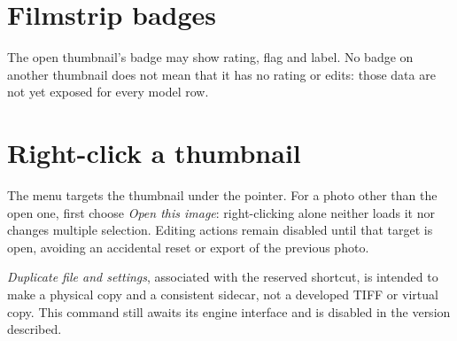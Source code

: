 
\section{Filmstrip badges}
The open thumbnail's badge may show rating, flag and label. No badge on another
thumbnail does not mean that it has no rating or edits: those data are not yet
exposed for every model row.

\section{Right-click a thumbnail}
The menu targets the thumbnail under the pointer. For a photo other than the
open one, first choose \emph{Open this image}: right-clicking alone neither
loads it nor changes multiple selection. Editing actions remain disabled
until that target is open, avoiding an accidental reset or export of the
previous photo.

\emph{Duplicate file and settings}, associated with the reserved
 shortcut, is intended to make a physical copy and a consistent
sidecar, not a developed TIFF or virtual copy. This command still awaits its
engine interface and is disabled in the version described.
